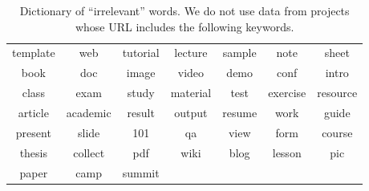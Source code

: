 \documentclass[smallextended]{svjour3}
\newcommand{\respto}[1]{
\fcolorbox{black}{black!15}{%
\label{resp:#1}%
\bf\scriptsize R{#1}}}
\begin{document}
 
\begin{table} 
\centering
\caption{
Dictionary of ``irrelevant'' words. We do not use data from projects whose URL includes the following keywords.\respto{2H}
}
\label{tbl:dict}
\begin{adjustbox}{max width=0.98\textwidth}
\begin{tabular}{ccccccc}
\rowcolor[HTML]{BDBDBD} 
\multicolumn{7}{c}{\cellcolor[HTML]{BDBDBD}{\color[HTML]{000000} Suspicious Keywords}} \\ \hline
\rowcolor[HTML]{FFFFFF} 
{\color[HTML]{000000} template} & {\color[HTML]{000000} web} & {\color[HTML]{000000} tutorial} & {\color[HTML]{000000} lecture} & {\color[HTML]{000000} sample} & {\color[HTML]{000000} note} & {\color[HTML]{000000} sheet} \\
\rowcolor[HTML]{F3F3F3} 
{\color[HTML]{000000} book} & {\color[HTML]{000000} doc} & {\color[HTML]{000000} image} & {\color[HTML]{000000} video} & {\color[HTML]{000000} demo} & {\color[HTML]{000000} conf} & {\color[HTML]{000000} intro} \\
\rowcolor[HTML]{FFFFFF} 
{\color[HTML]{000000} class} & {\color[HTML]{000000} exam} & {\color[HTML]{000000} study} & {\color[HTML]{000000} material} & {\color[HTML]{000000} test} & {\color[HTML]{000000} exercise} & {\color[HTML]{000000} resource} \\
\rowcolor[HTML]{F3F3F3} 
{\color[HTML]{000000} article} & {\color[HTML]{000000} academic} & {\color[HTML]{000000} result} & {\color[HTML]{000000} output} & {\color[HTML]{000000} resume} & {\color[HTML]{000000} work} & {\color[HTML]{000000} guide} \\
\rowcolor[HTML]{FFFFFF} 
{\color[HTML]{000000} present} & {\color[HTML]{000000} slide} & {\color[HTML]{000000} 101} & {\color[HTML]{000000} qa} & {\color[HTML]{000000} view} & {\color[HTML]{000000} form} & {\color[HTML]{000000} course} \\
\rowcolor[HTML]{F3F3F3} 
{\color[HTML]{000000} thesis} & {\color[HTML]{000000} collect} & {\color[HTML]{000000} pdf} & {\color[HTML]{000000} wiki} & {\color[HTML]{000000} blog} & {\color[HTML]{000000} lesson} & {\color[HTML]{000000} pic} \\
\rowcolor[HTML]{FFFFFF} 
{\color[HTML]{000000} paper} & {\color[HTML]{000000} camp} & {\color[HTML]{000000} summit} & {\color[HTML]{000000} } & {\color[HTML]{000000} } & {\color[HTML]{000000} } & {\color[HTML]{000000} }
\end{tabular}
\end{adjustbox}
\end{table}
\end{document}
